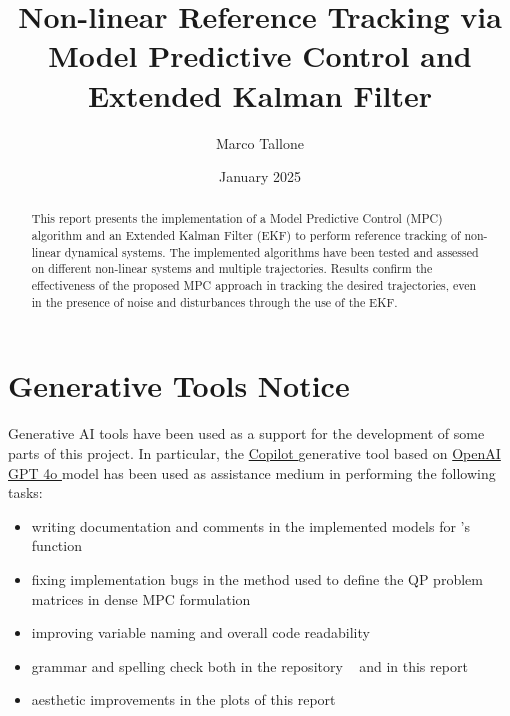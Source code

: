 \documentclass{settings/notex}
\title{Non-linear Reference Tracking via\\
	Model Predictive Control and Extended Kalman Filter\\
  \vspace{0.5cm}
  \fontsize{12pt}{12pt}\selectfont{
    Modelling and Control of Cyber-Physical Systems II\\
    \vspace{0.25cm}
    University of Trieste (UniTS)
  }
}
\author{Marco Tallone}
\date{January 2025}
\begin{document}
\maketitle

\begin{abstract}
\noindent
This report presents the implementation of a Model Predictive Control (MPC)
algorithm and an Extended Kalman Filter (EKF) to perform reference tracking of
non-linear dynamical systems. The implemented algorithms have been tested and assessed on different non-linear systems and multiple
trajectories. Results confirm the effectiveness of the proposed MPC approach in
tracking the desired trajectories, even in the presence of noise and
disturbances through the use of the EKF.
\end{abstract}








\pagebreak


\pagebreak



\vspace{1cm}

\section*{Generative Tools Notice}

Generative AI tools have been used as a support for the development of some
parts of this
project. In particular, the
\href{https://en.wikipedia.org/wiki/Microsoft_Copilot}{Copilot \faLink} generative tool
based on \href{https://en.wikipedia.org/wiki/GPT-4}{OpenAI GPT 4o \faLink} model has
been used as assistance medium in performing the following tasks:

\begin{itemize}
	 \item writing documentation and comments in the implemented models for
		 's  function

	\item fixing implementation bugs in the 
		method used to define the QP problem matrices in dense MPC formulation

	 \item improving variable naming and overall code readability

	\item grammar and spelling check both in the repository
		~\cite{github} and in this report

	\item aesthetic improvements in the plots of this report

\end{itemize}
\end{document}
